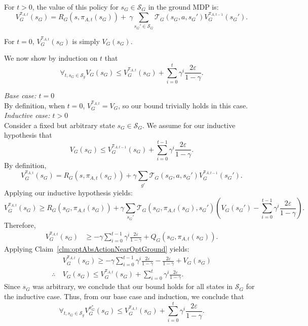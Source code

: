 For $t > 0$, the value of this policy for $s_G \in \mathcal{S}_G$ in the ground \ac{MDP} is:
\[
V_G^{\pi_{A,t}}(s_G) = R_G(s, \pi_{A,t}(s_G)) +\ \gamma \sum_{{s_G}' \in \mathcal{S}_G}\mathcal{T}_G(s_G, a, {s_G}')V_G^{\pi_{A,t-1}}({s_G}').
\]

For $t=0$, $V_G^{\pi_{A,t}}(s_G)$ is simply $V_G(s_G)$.

We now show by induction on $t$ that
\begin{equation}
\forall_{t, s_G \in \mathcal{S}_g} V_G(s_G) \leq  V_G^{\pi_{A,t}}(s_G) + \sum_{i=0}^{t}\gamma^i \frac{2\varepsilon}{1-\gamma}.
\end{equation}

\noindent \textit{Base case: $t=0$} \\

By definition, when $t=0$, $V_G^{\pi_{A,t}} = V_G$, so our bound trivially holds in this case. \\

\noindent \textit{Inductive case: $t > 0$} \\

Consider a fixed but arbitrary state $s_G \in \mathcal{S}_G$.
We assume for our inductive hypothesis that
\begin{equation}
V_G(s_G) \leq V_G^{\pi_{A,t-1}}(s_G) + \sum_{i=0}^{t-1}\gamma^i \frac{2\varepsilon}{1-\gamma}.
\end{equation}
By definition,
\[
V_G^{\pi_{A,t}}(s_G) = R_G(s, \pi_{A,t}(s_G)) + \gamma \sum_{g'}\mathcal{T}_G(s_G, a, {s_G}')V_G^{\pi_{A,t-1}}({s_G}').
\]
Applying our inductive hypothesis yields:
\[
V_G^{\pi_{A,t}}(s_G) \geq R_G(s_G, \pi_{A,t}(s_G)) + \gamma \sum_{{s_G}'}\mathcal{T}_G(s_G, \pi_{A,t}(s_G), {s_G}')\left(V_G({s_G}') - \sum_{i=0}^{t-1}\gamma^i \frac{2\varepsilon}{1-\gamma} \right).
\]
Therefore,
\begin{align*}
V_G^{\pi_{A,t}}(s_G) &\geq -\gamma\sum_{i=0}^{t-1}\gamma^i \frac{2\varepsilon}{1-\gamma} + Q_G(s_G, \pi_{A,t} (s_G)).
\end{align*}
Applying Claim~\ref{clm:optAbsActionNearOptGround} yields:
\begin{align*}
&V_G^{\pi_{A,t}}(s_G) \geq -\gamma\sum_{i=0}^{t-1}\gamma^i \frac{2\varepsilon}{1-\gamma} - \frac{2\varepsilon}{1-\gamma} + V_{G}(s_G) \\
\therefore\ &V_G(s_G) \leq V_G^{\pi_{A,t}}(s_G)  + \sum_{i=0}^{t}\gamma^i \frac{2\varepsilon}{1-\gamma}.
\end{align*}
Since $s_G$ was arbitrary, we conclude that our bound holds for all states in $\mathcal{S}_G$ for the inductive case.
Thus, from our base case and induction, we conclude that
\begin{equation}
\forall_{t, s_G \in \mathcal{S}_g} V_G^{\pi_G^*}(s_G) \leq  V_G^{\pi_{A,t}}(s_G) + \sum_{i=0}^{t}\gamma^i \frac{2\varepsilon}{1-\gamma}.
\end{equation}

